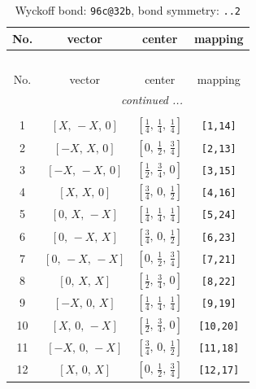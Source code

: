 \documentclass[fleqn,8pt]{jsarticle}
\begin{document}
\begin{longtable}{cccc}
\caption{Wyckoff bond: {\tt 96c@32b}, bond symmetry: {\tt ..2}}
 \\
 \hline \hline
No. & vector & center & mapping \\ \hline \endfirsthead

\multicolumn{3}{l}{\tablename\ \thetable{}} \\
 \hline \hline
No. & vector & center & mapping \\ \hline \endhead

 \hline \hline
\multicolumn{3}{r}{\footnotesize\it continued ...} \\ \endfoot

 \hline \hline
\multicolumn{3}{r}{} \\ \endlastfoot

1 & $\left[ X,\, - X,\, 0 \right]$ & $\left[ \frac{1}{4},\, \frac{1}{4},\, \frac{1}{4} \right]$ & {\tt [1,14]} \\ \hline
2 & $\left[ - X,\, X,\, 0 \right]$ & $\left[ 0,\, \frac{1}{2},\, \frac{3}{4} \right]$ & {\tt [2,13]} \\ \hline
3 & $\left[ - X,\, - X,\, 0 \right]$ & $\left[ \frac{1}{2},\, \frac{3}{4},\, 0 \right]$ & {\tt [3,15]} \\ \hline
4 & $\left[ X,\, X,\, 0 \right]$ & $\left[ \frac{3}{4},\, 0,\, \frac{1}{2} \right]$ & {\tt [4,16]} \\ \hline
5 & $\left[ 0,\, X,\, - X \right]$ & $\left[ \frac{1}{4},\, \frac{1}{4},\, \frac{1}{4} \right]$ & {\tt [5,24]} \\ \hline
6 & $\left[ 0,\, - X,\, X \right]$ & $\left[ \frac{3}{4},\, 0,\, \frac{1}{2} \right]$ & {\tt [6,23]} \\ \hline
7 & $\left[ 0,\, - X,\, - X \right]$ & $\left[ 0,\, \frac{1}{2},\, \frac{3}{4} \right]$ & {\tt [7,21]} \\ \hline
8 & $\left[ 0,\, X,\, X \right]$ & $\left[ \frac{1}{2},\, \frac{3}{4},\, 0 \right]$ & {\tt [8,22]} \\ \hline
9 & $\left[ - X,\, 0,\, X \right]$ & $\left[ \frac{1}{4},\, \frac{1}{4},\, \frac{1}{4} \right]$ & {\tt [9,19]} \\ \hline
10 & $\left[ X,\, 0,\, - X \right]$ & $\left[ \frac{1}{2},\, \frac{3}{4},\, 0 \right]$ & {\tt [10,20]} \\ \hline
11 & $\left[ - X,\, 0,\, - X \right]$ & $\left[ \frac{3}{4},\, 0,\, \frac{1}{2} \right]$ & {\tt [11,18]} \\ \hline
12 & $\left[ X,\, 0,\, X \right]$ & $\left[ 0,\, \frac{1}{2},\, \frac{3}{4} \right]$ & {\tt [12,17]} \\ \hline

\end{longtable}
\end{document}

